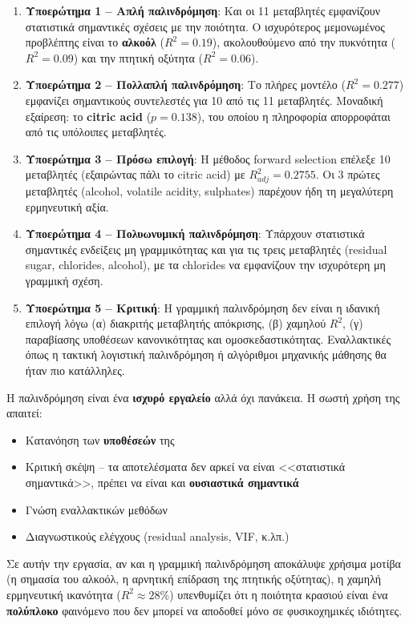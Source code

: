 \documentclass[12pt,a4paper]{article}
\begin{document}
\begin{enumerate}
    \item \textbf{Υποερώτημα 1 -- Απλή παλινδρόμηση}: Και οι 11 μεταβλητές εμφανίζουν στατιστικά σημαντικές σχέσεις με την ποιότητα. Ο ισχυρότερος μεμονωμένος προβλέπτης είναι το \textbf{αλκοόλ} ($R^2 = 0.19$), ακολουθούμενο από την πυκνότητα ($R^2 = 0.09$) και την πτητική οξύτητα ($R^2 = 0.06$).

    \item \textbf{Υποερώτημα 2 -- Πολλαπλή παλινδρόμηση}: Το πλήρες μοντέλο ($R^2 = 0.277$) εμφανίζει σημαντικούς συντελεστές για 10 από τις 11 μεταβλητές. Μοναδική εξαίρεση: το \textbf{citric acid} ($p = 0.138$), του οποίου η πληροφορία απορροφάται από τις υπόλοιπες μεταβλητές.

    \item \textbf{Υποερώτημα 3 -- Πρόσω επιλογή}: Η μέθοδος forward selection επέλεξε 10 μεταβλητές (εξαιρώντας πάλι το citric acid) με $R^2_{adj} = 0.2755$. Οι 3 πρώτες μεταβλητές (alcohol, volatile acidity, sulphates) παρέχουν ήδη τη μεγαλύτερη ερμηνευτική αξία.

    \item \textbf{Υποερώτημα 4 -- Πολυωνυμική παλινδρόμηση}: Υπάρχουν στατιστικά σημαντικές ενδείξεις μη γραμμικότητας και για τις τρεις μεταβλητές (residual sugar, chlorides, alcohol), με τα chlorides να εμφανίζουν την ισχυρότερη μη γραμμική σχέση.

    \item \textbf{Υποερώτημα 5 -- Κριτική}: Η γραμμική παλινδρόμηση δεν είναι η ιδανική επιλογή λόγω (α) διακριτής μεταβλητής απόκρισης, (β) χαμηλού $R^2$, (γ) παραβίασης υποθέσεων κανονικότητας και ομοσκεδαστικότητας. Εναλλακτικές όπως η τακτική λογιστική παλινδρόμηση ή αλγόριθμοι μηχανικής μάθησης θα ήταν πιο κατάλληλες.
\end{enumerate}

\vspace{1cm}

\begin{theorybox}[Τι μάθαμε;]
Η παλινδρόμηση είναι ένα \textbf{ισχυρό εργαλείο} αλλά όχι πανάκεια. Η σωστή χρήση της απαιτεί:
\begin{itemize}
    \item Κατανόηση των \textbf{υποθέσεών} της
    \item Κριτική σκέψη -- τα αποτελέσματα δεν αρκεί να είναι <<στατιστικά σημαντικά>>, πρέπει να είναι και \textbf{ουσιαστικά σημαντικά}
    \item Γνώση εναλλακτικών μεθόδων
    \item Διαγνωστικούς ελέγχους (residual analysis, VIF, κ.λπ.)
\end{itemize}

Σε αυτήν την εργασία, αν και η γραμμική παλινδρόμηση αποκάλυψε χρήσιμα μοτίβα (η σημασία του αλκοόλ, η αρνητική επίδραση της πτητικής οξύτητας), η χαμηλή ερμηνευτική ικανότητα ($R^2 \approx 28\%$) υπενθυμίζει ότι η ποιότητα κρασιού είναι ένα \textbf{πολύπλοκο} φαινόμενο που δεν μπορεί να αποδοθεί μόνο σε φυσικοχημικές ιδιότητες.
\end{theorybox}
\end{document}
